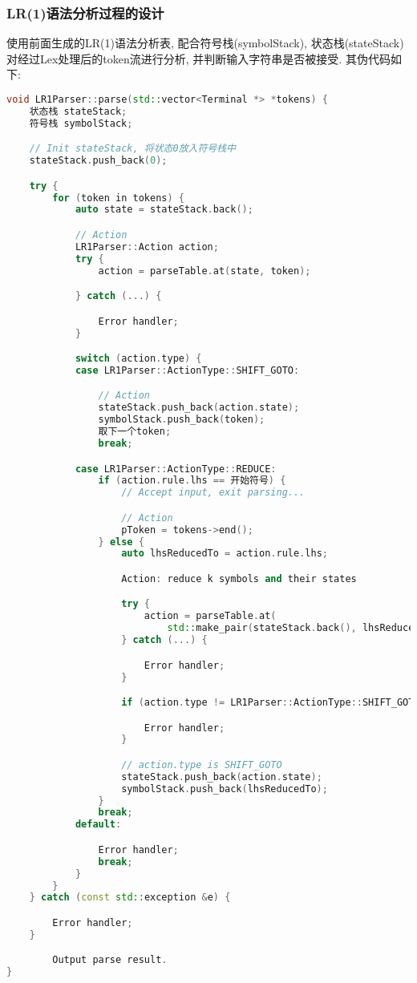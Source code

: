 \subsubsection{LR(1)语法分析过程的设计}
使用前面生成的LR(1)语法分析表, 配合符号栈(symbolStack),
状态栈(stateStack)对经过Lex处理后的token流进行分析, 并判断输入字符串是否被接受.
其伪代码如下:
\begin{lstlisting}[language=c++]
void LR1Parser::parse(std::vector<Terminal *> *tokens) {
    状态栈 stateStack;
    符号栈 symbolStack;

    // Init stateStack, 将状态0放入符号栈中
    stateStack.push_back(0);

    try {
        for (token in tokens) {
            auto state = stateStack.back();

            // Action
            LR1Parser::Action action;
            try {
                action = parseTable.at(state, token);

            } catch (...) {

                Error handler;
            }

            switch (action.type) {
            case LR1Parser::ActionType::SHIFT_GOTO:

                // Action
                stateStack.push_back(action.state);
                symbolStack.push_back(token);
                取下一个token;
                break;

            case LR1Parser::ActionType::REDUCE:
                if (action.rule.lhs == 开始符号) {
                    // Accept input, exit parsing...

                    // Action
                    pToken = tokens->end();
                } else {
                    auto lhsReducedTo = action.rule.lhs;

                    Action: reduce k symbols and their states

                    try {
                        action = parseTable.at(
                            std::make_pair(stateStack.back(), lhsReducedTo));
                    } catch (...) {

                        Error handler;
                    }

                    if (action.type != LR1Parser::ActionType::SHIFT_GOTO) {

                        Error handler;
                    }

                    // action.type is SHIFT_GOTO
                    stateStack.push_back(action.state);
                    symbolStack.push_back(lhsReducedTo);
                }
                break;
            default:

                Error handler;
                break;
            }
        }
    } catch (const std::exception &e) {

        Error handler;
    }

		Output parse result.
}
\end{lstlisting}

